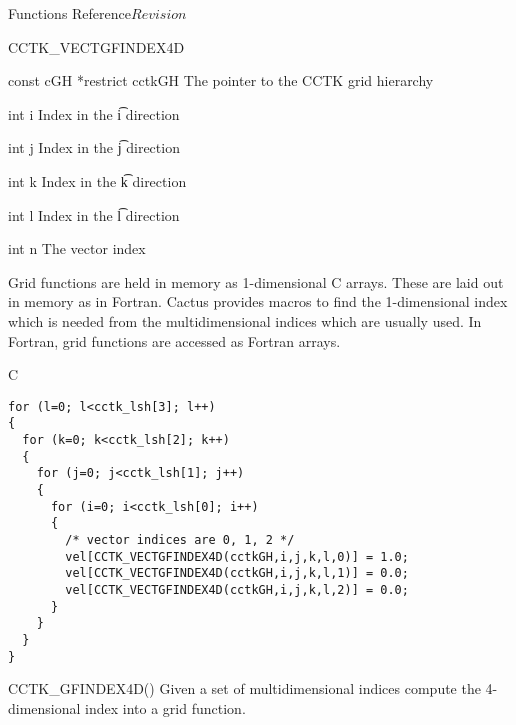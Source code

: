 \begin{cactuspart}{ Functions Reference}{}{$Revision$}
\begin{FunctionDescription}{CCTK\_VECTGFINDEX4D}
\begin{ParameterSection}
\begin{Parameter} {const cGH *restrict cctkGH}
The pointer to the CCTK grid hierarchy
\end{Parameter}

\begin{Parameter} {int i}
Index in the \t{i} direction
\end{Parameter}

\begin{Parameter} {int j}
Index in the \t{j} direction
\end{Parameter}

\begin{Parameter} {int k}
Index in the \t{k} direction
\end{Parameter}

\begin{Parameter} {int l}
Index in the \t{l} direction
\end{Parameter}

\begin{Parameter} {int n}
The vector index
\end{Parameter}
\end{ParameterSection}

\begin{Discussion}
Grid functions are held in memory as 1-dimensional C arrays. These are
laid out in memory as in Fortran. Cactus provides macros to find the
1-dimensional index which is needed from the multidimensional indices which
are usually used. In Fortran, grid functions are accessed as Fortran arrays.
\end{Discussion}
\begin{ExampleSection}
\begin{Example}{C}
\begin{verbatim}
for (l=0; l<cctk_lsh[3]; l++)
{
  for (k=0; k<cctk_lsh[2]; k++)
  {
    for (j=0; j<cctk_lsh[1]; j++)
    {
      for (i=0; i<cctk_lsh[0]; i++)
      {
        /* vector indices are 0, 1, 2 */
        vel[CCTK_VECTGFINDEX4D(cctkGH,i,j,k,l,0)] = 1.0;
        vel[CCTK_VECTGFINDEX4D(cctkGH,i,j,k,l,1)] = 0.0;
        vel[CCTK_VECTGFINDEX4D(cctkGH,i,j,k,l,2)] = 0.0;
      }
    }
  }
}
\end{verbatim}
\end{Example}
\end{ExampleSection}
\begin{SeeAlsoSection}
\begin{SeeAlso}{CCTK\_GFINDEX4D()}
Given a set of multidimensional indices compute the 4-dimensional index into a
grid function.
\end{SeeAlso}


\end{SeeAlsoSection}
\end{FunctionDescription}
\end{cactuspart}
